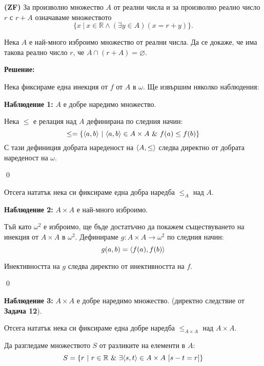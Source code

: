 \begin{problem}
\textbf{(ZF)}
За произволно множество $A$ от реални числа и за произволно реално число $r$ с $r + A$ означаваме множеството
\[
\{x\ |\ x \in \mathbb{R} \land (\exists y \in A)(x = r + y)\}.
\]

\quad
Нека $A$ е най-много изброимо множество от реални числа.
Да се докаже, че има такова реално число $r$, че $A \cap (r+A) = \varnothing$.
\end{problem}

\textbf{Решение:}

\smallbreak
\quad
Нека фиксираме една инекция от $f$ от $A$ в $\omega$.
Ще извършим няколко наблюдения:

\smallbreak

\quad
\textbf{Наблюдение 1:}
$A$ е добре наредимо множество.
\begin{tcolorbox}[mybox={Доказателство:}]
\quad
Нека $\leq$ е релация над $A$ дефинирана по следния начин:
\[
\leq = \{\langle a, b \rangle\ |\ \langle a, b \rangle \in A \times A \ \&\  f(a) \leq f(b) \}
\]
\quad
С тази дефиниция добрата нареденост на $\langle A, \leq \rangle$ следва директно от добрата нареденост на $\omega$.

\qed
\end{tcolorbox}

\quad
Отсега нататък нека си фиксираме една добра наредба $\leq_A$ над $A$.

\smallbreak

\quad
\textbf{Наблюдение 2:}
$A \times A$ е най-много изброимо.
\begin{tcolorbox}[mybox={Доказателство:}]
\quad
Тъй като $\omega^2$ е изброимо, ще бъде достатъчно да покажем съществуването на инекция от $A \times A$ в $\omega^2$.
Дефинираме $g: A \times A \to \omega^2$ по следния начин:
\[
g(a, b) = \langle f(a), f(b) \rangle
\]

\quad
Инективността на $g$ следва директно от инективността на $f$.

\qed
\end{tcolorbox}

\quad
\textbf{Наблюдение 3:}
$A \times A$ е добре наредимо множество. (директно следствие от \textbf{Задача 12}).

\quad
Отсега нататък нека си фиксираме една добре наредба $\leq_{A \times A}$ над $A \times A$.

\quad
Да разгледаме множеството $S$ от разликите на елементи в $A$:
\[
S = \{r\ |\ r \in \mathbb{R} \ \&\  \exists \langle s, t \rangle \in A \times A\ [s - t = r] \}
\]

